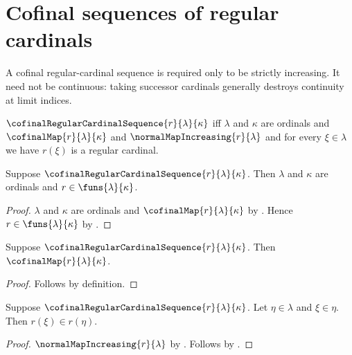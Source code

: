 \section{Cofinal sequences of regular cardinals}









A cofinal regular-cardinal sequence is required only to be strictly
increasing.  It need not be continuous: taking successor cardinals generally
destroys continuity at limit indices.

\begin{definition}\label{cofinal_regular_cardinal_sequence}
    $\cofinalRegularCardinalSequence{r}{\lambda}{\kappa}$ iff
        $\lambda$ and $\kappa$ are ordinals and
        $\cofinalMap{r}{\lambda}{\kappa}$ and
        $\normalMapIncreasing{r}{\lambda}$ and
        for every $\xi\in\lambda$ we have
            $r(\xi)$ is a regular cardinal.
\end{definition}

\begin{proposition}\label{cofinal_regular_cardinal_sequence_type}
    Suppose $\cofinalRegularCardinalSequence{r}{\lambda}{\kappa}$.
    Then $\lambda$ and $\kappa$ are ordinals and
        $r\in\funs{\lambda}{\kappa}$.
\end{proposition}
\begin{proof}
    $\lambda$ and $\kappa$ are ordinals and
        $\cofinalMap{r}{\lambda}{\kappa}$ by
        .
    Hence $r\in\funs{\lambda}{\kappa}$ by .
\end{proof}

\begin{proposition}\label{cofinal_regular_cardinal_sequence_is_cofinal}
    Suppose $\cofinalRegularCardinalSequence{r}{\lambda}{\kappa}$.
    Then $\cofinalMap{r}{\lambda}{\kappa}$.
\end{proposition}
\begin{proof}
    Follows by definition.
\end{proof}

\begin{proposition}\label{cofinal_regular_cardinal_sequence_increasing}
    Suppose $\cofinalRegularCardinalSequence{r}{\lambda}{\kappa}$.
    Let $\eta\in\lambda$ and $\xi\in\eta$.
    Then $r(\xi)\in r(\eta)$.
\end{proposition}
\begin{proof}
    $\normalMapIncreasing{r}{\lambda}$ by
        .
    Follows by .
\end{proof}


